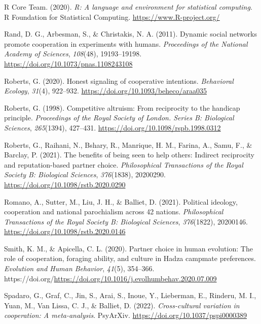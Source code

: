 \documentclass[
  man,floatsintext]{apa6}
\newlength{\cslhangindent}
\newlength{\cslentryspacingunit} %
\newenvironment{CSLReferences}[2] %
 {%
  \setlength{\parindent}{0pt}
  \ifodd #1
  \let\oldpar\par
  \def\par{\hangindent=\cslhangindent\oldpar}
  \fi
  \setlength{\parskip}{#2\cslentryspacingunit}
 }%
 {}
\begin{document}
\begin{CSLReferences}{1}{0}
\leavevmode{}%
R Core Team. (2020). \emph{R: A language and environment for statistical computing}. R Foundation for Statistical Computing. \url{https://www.R-project.org/}

\leavevmode{}%
Rand, D. G., Arbesman, S., \& Christakis, N. A. (2011). Dynamic social networks promote cooperation in experiments with humans. \emph{Proceedings of the National Academy of Sciences}, \emph{108}(48), 19193--19198. \url{https://doi.org/10.1073/pnas.1108243108}

\leavevmode{}%
Roberts, G. (2020). Honest signaling of cooperative intentions. \emph{Behavioral Ecology}, \emph{31}(4), 922--932. \url{https://doi.org/10.1093/beheco/araa035}

\leavevmode{}%
Roberts, G. (1998). Competitive altruism: From reciprocity to the handicap principle. \emph{Proceedings of the Royal Society of London. Series B: Biological Sciences}, \emph{265}(1394), 427--431. \url{https://doi.org/10.1098/rspb.1998.0312}

\leavevmode{}%
Roberts, G., Raihani, N., Bshary, R., Manrique, H. M., Farina, A., Samu, F., \& Barclay, P. (2021). The benefits of being seen to help others: Indirect reciprocity and reputation-based partner choice. \emph{Philosophical Transactions of the Royal Society B: Biological Sciences}, \emph{376}(1838), 20200290. \url{https://doi.org/10.1098/rstb.2020.0290}

\leavevmode{}%
Romano, A., Sutter, M., Liu, J. H., \& Balliet, D. (2021). Political ideology, cooperation and national parochialism across 42 nations. \emph{Philosophical Transactions of the Royal Society B: Biological Sciences}, \emph{376}(1822), 20200146. \url{https://doi.org/10.1098/rstb.2020.0146}

\leavevmode{}%
Smith, K. M., \& Apicella, C. L. (2020). Partner choice in human evolution: The role of cooperation, foraging ability, and culture in {Hadza} campmate preferences. \emph{Evolution and Human Behavior}, \emph{41}(5), 354--366. https://doi.org/\url{https://doi.org/10.1016/j.evolhumbehav.2020.07.009}

\leavevmode{}%
Spadaro, G., Graf, C., Jin, S., Arai, S., Inoue, Y., Lieberman, E., Rinderu, M. I., Yuan, M., Van Lissa, C. J., \& Balliet, D. (2022). \emph{Cross-cultural variation in cooperation: A meta-analysis}. PsyArXiv. \url{https://doi.org/10.1037/pspi0000389}


\end{CSLReferences}
\end{document}
